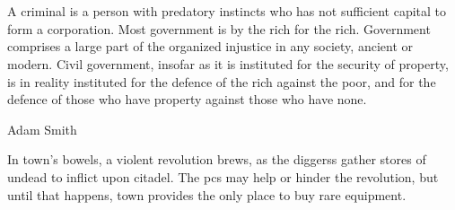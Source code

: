 \chapter{}
\epigraph{A criminal is a person with predatory instincts who has not sufficient capital to form a corporation. Most government is by the rich for the rich.
Government comprises a large part of the organized injustice in any society, ancient or modern.
Civil government, insofar as it is instituted for the security of property, is in reality instituted for the defence of the rich against the poor, and for the defence of those who have property against those who have none.}%
{Adam Smith}

\label{townChapter}

\begin{multicols}{2}
\noindent
In \gls{town}'s bowels, a violent revolution brews, as the \glspl{diggers} gather stores of undead to inflict upon \gls{citadel}.
The \glspl{pc} may help or hinder the revolution, but until that happens, \gls{town} provides the only place to buy rare equipment.

\end{multicols}


\section[\Glsfmttext{oolery}]{~}
\label{gnomishPart}


